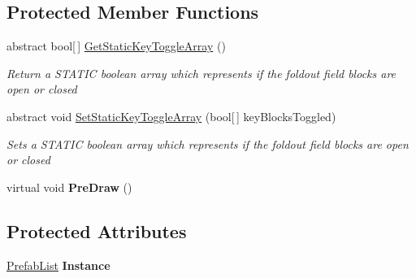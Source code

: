 \subsection*{Protected Member Functions}
\begin{DoxyCompactItemize}
\item 
abstract bool\mbox{[}$\,$\mbox{]} \hyperlink{class_prefab_list_editor_3_01_t_key_00_01_t_value_01_4_a94743b1cef0384af10fec9b4121d78b8}{Get\-Static\-Key\-Toggle\-Array} ()
\begin{DoxyCompactList}\small\item\em Return a S\-T\-A\-T\-I\-C boolean array which represents if the foldout field blocks are open or closed \end{DoxyCompactList}\item 
abstract void \hyperlink{class_prefab_list_editor_3_01_t_key_00_01_t_value_01_4_a7854686cfcba09b2c55ace182e38eddf}{Set\-Static\-Key\-Toggle\-Array} (bool\mbox{[}$\,$\mbox{]} key\-Blocks\-Toggled)
\begin{DoxyCompactList}\small\item\em Sets a S\-T\-A\-T\-I\-C boolean array which represents if the foldout field blocks are open or closed \end{DoxyCompactList}\item 
\hypertarget{class_prefab_list_editor_3_01_t_key_00_01_t_value_01_4_a8b66398e5fb2b747c14c860a98095b94}{virtual void {\bfseries Pre\-Draw} ()}\label{class_prefab_list_editor_3_01_t_key_00_01_t_value_01_4_a8b66398e5fb2b747c14c860a98095b94}

\end{DoxyCompactItemize}
\subsection*{Protected Attributes}
\begin{DoxyCompactItemize}
\item 
\hypertarget{class_prefab_list_editor_3_01_t_key_00_01_t_value_01_4_a7accbbaafa51db21d173281bf7f21918}{\hyperlink{class_skyrates_1_1_util_1_1_prefab_list}{Prefab\-List} {\bfseries Instance}}\label{class_prefab_list_editor_3_01_t_key_00_01_t_value_01_4_a7accbbaafa51db21d173281bf7f21918}

\end{DoxyCompactItemize}


